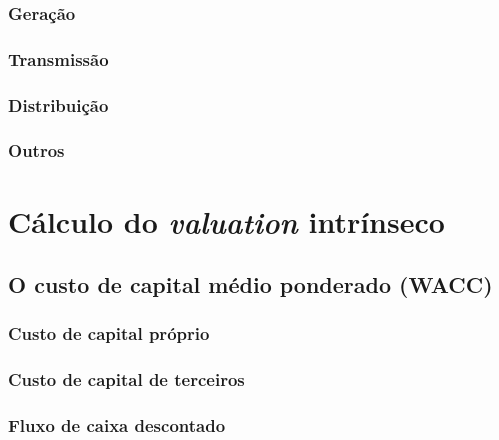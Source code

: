 \documentclass[grad,numbers]{coppe}
\begin{document}
  \hypertarget{gerauxe7uxe3o}{%
  \subsubsection{Geração}\label{gerauxe7uxe3o}}

  \hypertarget{transmissuxe3o}{%
  \subsubsection{Transmissão}\label{transmissuxe3o}}

  \hypertarget{distribuiuxe7uxe3o}{%
  \subsubsection{Distribuição}\label{distribuiuxe7uxe3o}}

  \hypertarget{outros}{%
  \subsubsection{Outros}\label{outros}}

  \hypertarget{cuxe1lculo-do-valuation-intruxednseco}{%
  \section{\texorpdfstring{Cálculo do \emph{valuation} intrínseco}{Cálculo do valuation intrínseco}}\label{cuxe1lculo-do-valuation-intruxednseco}}

  \hypertarget{o-custo-de-capital-muxe9dio-ponderado-wacc}{%
  \subsection{O custo de capital médio ponderado (WACC)}\label{o-custo-de-capital-muxe9dio-ponderado-wacc}}

  \hypertarget{custo-de-capital-pruxf3prio}{%
  \subsubsection{Custo de capital próprio}\label{custo-de-capital-pruxf3prio}}

  \hypertarget{custo-de-capital-de-terceiros}{%
  \subsubsection{Custo de capital de terceiros}\label{custo-de-capital-de-terceiros}}

  \hypertarget{fluxo-de-caixa-descontado}{%
  \subsubsection{Fluxo de caixa descontado}\label{fluxo-de-caixa-descontado}}
\end{document}
